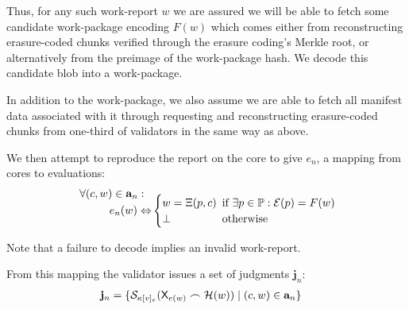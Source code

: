Thus, for any such work-report $w$ we are assured we will be able to fetch some candidate work-package encoding $F(w)$ which comes either from reconstructing erasure-coded chunks verified through the erasure coding's Merkle root, or alternatively from the preimage of the work-package hash. We decode this candidate blob into a work-package.

In addition to the work-package, we also assume we are able to fetch all manifest data associated with it through requesting and reconstructing erasure-coded chunks from one-third of validators in the same way as above.

We then attempt to reproduce the report on the core to give $e_n$, a mapping from cores to evaluations: \vskip -7pt
\begin{equation}
  \begin{aligned}
    \forall (c, w) \in \mathbf{a}_n :\ \ &\\[-10pt]
    e_n(w) \Leftrightarrow &\begin{cases}
      w = \Xi(p, c)\!\!\! &\text{if } \exists p \in \mathbb{P}: \mathcal{E}(p) = F(w) \\
      \bot &\text{otherwise}
    \end{cases}
  \end{aligned}\!\!
\end{equation}

Note that a failure to decode implies an invalid work-report.

From this mapping the validator issues a set of judgments $\mathbf{j}_n$:
\begin{align}
  \mathbf{j}_n &= \{ \mathcal{S}_{\kappa[v]_e}(\mathsf{X}_{e(w)} \frown \mathcal{H}(w)) \mid (c, w) \in \mathbf{a}_n \}
\end{align}


